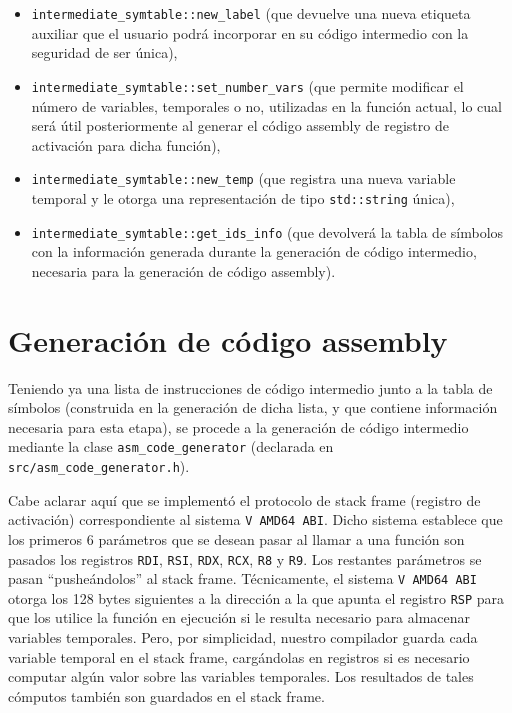 \documentclass[12pt, a4paper, titlepage]{article}
\begin{document}
  \begin{itemize}
  	\item {\tt intermediate\_symtable::new\_label} (que devuelve una nueva
  	etiqueta auxiliar que el usuario podrá incorporar en su código intermedio
  	con la seguridad de ser	única),
  	\item {\tt intermediate\_symtable::set\_number\_vars} (que permite modificar
  	el número de variables, temporales o no, utilizadas en la función actual, lo
  	cual será útil posteriormente al generar el código assembly de registro de
  	activación para dicha función),
  	\item {\tt intermediate\_symtable::new\_temp} (que registra una nueva
  	variable temporal y le otorga una representación de tipo {\tt std::string}
  	única),
    \item {\tt intermediate\_symtable::get\_ids\_info} (que devolverá la tabla
    de símbolos con la información generada durante la generación de código
    intermedio, necesaria para la generación de código assembly).
  \end{itemize}

  \section{Generación de código assembly}

  Teniendo ya una lista de instrucciones de código intermedio junto a la tabla
  de símbolos (construida en la generación de dicha lista, y que contiene
  información necesaria para esta etapa), se procede a la generación de código
  intermedio mediante la clase {\tt asm\_code\_generator} (declarada en
  {\tt src/asm\_code\_generator.h}).

	Cabe aclarar aquí que se implementó el protocolo de stack frame (registro de
	activación) correspondiente al sistema {\tt V AMD64 ABI}. Dicho sistema
	establece que los primeros 6 parámetros que se desean pasar al llamar a una
	función son pasados los registros {\tt RDI}, {\tt RSI}, {\tt RDX}, {\tt RCX},
	{\tt R8} y {\tt R9}. Los restantes parámetros se pasan ``pusheándolos'' al
	stack frame. Técnicamente, el sistema {\tt V AMD64 ABI} otorga los 128 bytes
	siguientes a la dirección a la que apunta el registro {\tt RSP} para que los
	utilice la función en ejecución si le resulta necesario para almacenar
	variables temporales. Pero, por simplicidad, nuestro compilador guarda cada
	variable temporal en el stack frame, cargándolas en registros si es necesario
	computar algún valor sobre las variables temporales. Los resultados de tales
	cómputos también son guardados en el stack frame.
\end{document}
